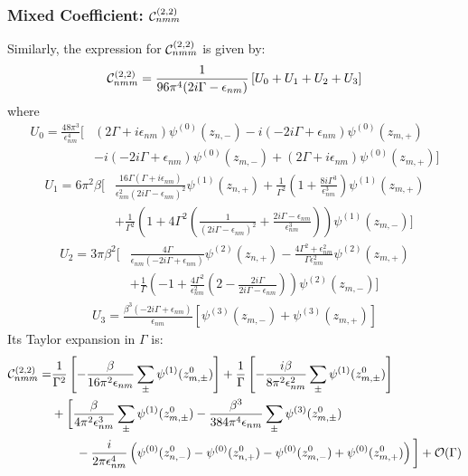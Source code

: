 \documentclass[twocolumn, prx, reprint, amsfonts, amsmath, amssymb, longbibliography, floatfix, aps]{revtex4-2}
\begin{document}
\subsubsection{Mixed Coefficient: \texorpdfstring{${\cal C}_{nmm}^{(2, 2)}$}{Cnmm}}
Similarly, the expression for ${\cal C}_{nmm}^{(2, 2)}$ is given by:
\begin{align}
{\cal C}_{nmm}^{(2, 2)} = \frac{1}{96 \pi^4 (2 i \Gamma - \epsilon_{nm})} \left[ U_0 + U_1 + U_2 + U_3 \right]
\end{align}
where
\begin{align}
U_0 = \frac{48 \pi^3}{\epsilon_{nm}^4}  \Bigg[
& (2 \Gamma + i \epsilon_{nm}) \psi^{(0)}(z_{n,-})
- i (-2 i \Gamma + \epsilon_{nm}) \psi^{(0)}(z_{m,+}) \nonumber \\
& - i (-2 i \Gamma + \epsilon_{nm}) \psi^{(0)}(z_{m,-})
+ (2 \Gamma + i \epsilon_{nm}) \psi^{(0)}(z_{m,+})
\Bigg]
\end{align}
\begin{align}
U_1 = 6 \pi^2 \beta \Bigg[
& \frac{16 \Gamma (\Gamma + i \epsilon_{nm})}{\epsilon_{nm}^2 (2 i \Gamma - \epsilon_{nm})^2} \psi^{(1)}(z_{n,+}) + \frac{1}{\Gamma^2} \left(1 + \frac{8 i \Gamma^3}{\epsilon_{nm}^3}\right) \psi^{(1)}(z_{m,+}) \nonumber \\
& + \frac{1}{\Gamma^2} \left(1 + 4 \Gamma^2 \left(\frac{1}{(2 i \Gamma - \epsilon_{nm})^2} + \frac{2 i \Gamma - \epsilon_{nm}}{\epsilon_{nm}^3}\right)\right) \psi^{(1)}(z_{m,-}) 
\Bigg]
\end{align}
\begin{align}
U_2 = 3 \pi \beta^2 \Bigg[
& \frac{4 \Gamma}{\epsilon_{nm} (-2 i \Gamma + \epsilon_{nm})} \psi^{(2)}(z_{n,+}) - \frac{4 \Gamma^2 + \epsilon_{nm}^2}{\Gamma \epsilon_{nm}^2} \psi^{(2)}(z_{m,+}) \nonumber \\
& + \frac{1}{\Gamma} \left(-1 + \frac{4 \Gamma^2}{\epsilon_{nm}^2} \left(2 - \frac{2 i \Gamma}{2 i \Gamma - \epsilon_{nm}}\right)\right) \psi^{(2)}(z_{m,-})
\Bigg]
\end{align}
\begin{align}
U_3 = \frac{\beta^3 (-2 i \Gamma + \epsilon_{nm})}{\epsilon_{nm}} \left[ \psi^{(3)}(z_{m,-}) + \psi^{(3)}(z_{m,+}) \right]
\end{align}
Its Taylor expansion in $\Gamma$ is:
\begin{align}
{\cal C}_{nmm}^{(2, 2)} = & \frac{1}{\Gamma^2} \left[ -\frac{\beta}{16\pi^2\epsilon_{nm}} \sum_{\pm} \psi^{(1)}(z_{m,\pm}^0) \right] + \frac{1}{\Gamma} \left[ -\frac{i\beta}{8\pi^2\epsilon_{nm}^2} \sum_{\pm} \psi^{(1)}(z_{m,\pm}^0) \right] \nonumber \\
& + \bigg[ \frac{\beta}{4\pi^2\epsilon_{nm}^3} \sum_{\pm} \psi^{(1)}(z_{m,\pm}^0) - \frac{\beta^3}{384\pi^4\epsilon_{nm}} \sum_{\pm} \psi^{(3)}(z_{m,\pm}^0) \nonumber \\
& \qquad - \frac{i}{2\pi\epsilon_{nm}^4} \left( \psi^{(0)}(z_{n,-}^0) - \psi^{(0)}(z_{n,+}^0) - \psi^{(0)}(z_{m,-}^0) + \psi^{(0)}(z_{m,+}^0) \right) \bigg] + {\cal O}(\Gamma)
\end{align}
\end{document}
